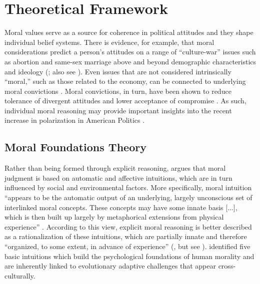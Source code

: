 \documentclass[12pt]{article}
\begin{document}
\section{Theoretical Framework}

Moral values serve as a source for coherence in political attitudes and they shape individual belief systems. There is evidence, for example, that moral considerations predict a person's attitudes on a range of ``culture-war'' issues such as abortion and same-sex marriage above and beyond demographic characteristics and ideology (\citealt{koleva2012tracing}; also see \citealt{clifford2015concerns}). Even issues that are not considered intrinsically ``moral,'' such as those related to the economy, can be connected to underlying moral convictions \citep{ryan2014reconsidering}. Moral convictions, in turn, have been shown to reduce tolerance of divergent attitudes and lower acceptance of compromise \citep[][]{skitka2010psychology,ryan2016no}. As such, individual moral reasoning may provide important insights into the recent increase in polarization in American Politics \citep{iyengar2015fear}.


\subsection{Moral Foundations Theory}

Rather than being formed through explicit reasoning, \citet{haidt2001emotional} argues that moral judgment is based on automatic and affective intuitions, which are in turn influenced by social and environmental factors. More specifically, moral intuition ``appears to be the automatic output of an underlying, largely unconscious set of interlinked moral concepts. These concepts may have some innate basis [...], which is then built up largely by metaphorical extensions from physical experience'' \citep[825]{haidt2001emotional}. According to this view, explicit moral reasoning is better described as a rationalization of these intuitions, which are partially innate and therefore ``organized, to some extent, in advance of experience'' (\citealt[367]{haidt2008moral}, but see \citealt{suhler2011can}). \citet{haidt2008moral} identified five basic intuitions which build the psychological foundations of human morality and are inherently linked to evolutionary adaptive challenges that appear cross-culturally. 
\end{document}

